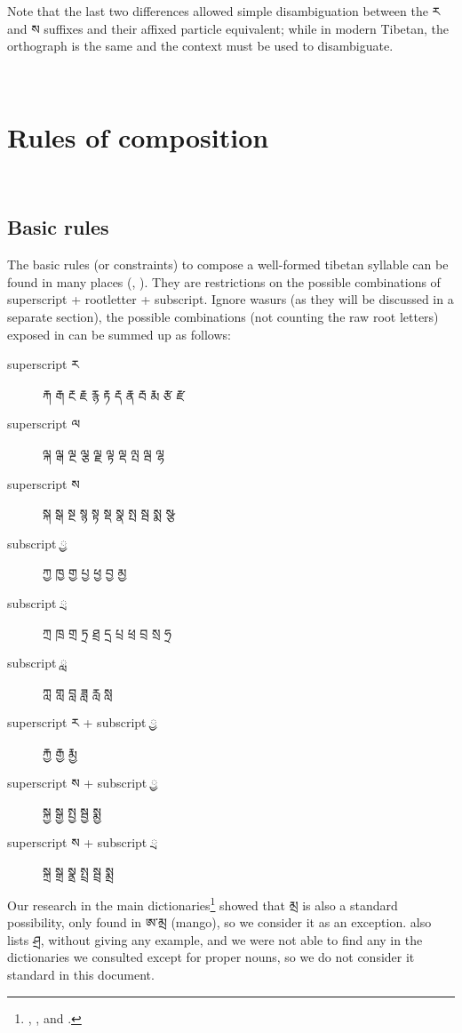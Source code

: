 \documentclass[%
a4paper,%
pagesize,%
12pt,%
parskip=off,%
bibliography=totoc,%
numbers=noenddot,%
DIV=12,%
twoside=semi,%
headings=normal%
]{scrartcl}
\begin{document}
Note that the last two differences allowed simple disambiguation between the ར and ས suffixes and their affixed particle equivalent; while in modern Tibetan, the orthograph is the same and the context must be used to disambiguate.

­\section{Rules of composition}

­\subsection{Basic rules}

The basic rules (or constraints) to compose a well-formed tibetan syllable can be found in many places (\cite{TournadreMST}, \cite{TsheshabGrammarTopics}). They are restrictions on the possible combinations of superscript + rootletter + subscript. Ignore wasurs (as they will be discussed in a separate section), the possible combinations (not counting the raw root letters) exposed in \cite{TsheshabGrammarTopics} can be summed up as follows:\label{mainstackdecomposition}

\begin{description}
\item[superscript ར] རྐ རྒ རྔ རྗ རྙ རྟ རྡ རྣ རྦ རྨ རྩ རྫ
\item[superscript ལ] ལྐ ལྒ ལྔ ལྕ ལྗ ལྟ ལྡ ལྤ ལྦ ལྷ
\item[superscript ས] སྐ སྒ སྔ སྙ སྟ སྡ སྣ སྤ སྦ སྨ སྩ
\item[subscript ྱ] ཀྱ ཁྱ གྱ པྱ ཕྱ བྱ མྱ
\item[subscript ྲ] ཀྲ ཁྲ གྲ ཏྲ ཐྲ དྲ པྲ ཕྲ བྲ སྲ ཧྲ
\item[subscript ླ] ཀླ གླ བླ ཟླ རླ སླ
\item[superscript ར + subscript ྱ] རྐྱ རྒྱ རྨྱ
\item[superscript ས + subscript ྱ] སྐྱ སྒྱ སྤྱ སྦྱ སྨྱ
\item[superscript ས + subscript ྲ] སྐྲ སྒྲ སྣྲ སྤྲ སྦྲ སྨྲ
\end{description} 

Our research in the main dictionaries\footnote{\cite{DorjeDagyig}, \cite{YisunTsikchen}, \cite{MonlamGrandDict} and \cite{DungkarEncyclopedia}.} showed that མྲ is also a standard possibility, only found in ཨ་མྲ (mango), so we consider it as an exception. \cite{TournadreMST} also lists ཤྲ, without giving any example, and we were not able to find any in the dictionaries we consulted except for proper nouns, so we do not consider it standard in this document.
\end{document}
